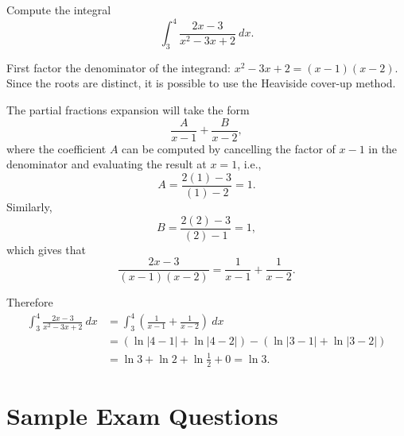 \documentclass{ximera}
\begin{document}
\begin{question}%

Compute the integral
\[\int_{3}^{4}\frac{2x-3}{x^2-3x+2}~dx.\]
\begin{multiplechoice}
\end{multiplechoice}
\begin{feedback}
First factor the denominator of the integrand: \(x^2-3x+2 = (x-1)(x-2)\). Since the roots are distinct, it is possible to use the Heaviside cover-up method.  \begin{hint} The partial fractions expansion will take the form \[\frac{A}{x-1} + \frac{B}{x-2}, \] where the coefficient \(A\) can be computed by cancelling the factor of \(x-1\) in the denominator and evaluating the result at \(x = 1\), i.e., \[A = \frac{2(1)-3}{(1)-2} = 1. \] Similarly, \[B = \frac{2(2)-3}{(2)-1} = 1,\] which gives that \[\frac{2x-3}{(x-1)(x-2)} = \frac{1}{x-1} + \frac{1}{x-2}. \] \begin{hint} Therefore
\[ \begin{aligned} 
\int_{3}^{4}\frac{2x-3}{x^2-3x+2}~dx & = \int_{3}^{4}\left(\frac{1}{x-1} + \frac{1}{x-2}\right)~dx \\
 & = \left(\ln |4-1| + \ln |4-2| \right) - \left(\ln |3-1| + \ln |3-2| \right)\\
 & = \ln 3 + \ln 2 + \ln \frac{1}{2} + 0 = \ln 3.\end{aligned}\] \end{hint} \end{hint}
\end{feedback}

\end{question}

\section*{Sample Exam Questions}
\end{document}
